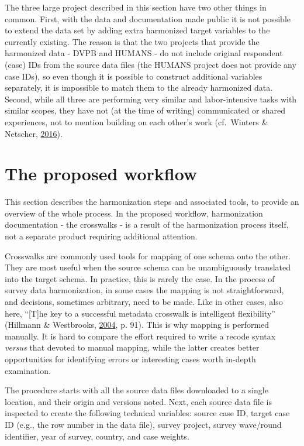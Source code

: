 \documentclass[12pt,]{article}
\begin{document}
The three large project described in this section have two other things in common. First, with the data and documentation made public it is not possible to extend the data set by adding extra harmonized target variables to the currently existing. The reason is that the two projects that provide the harmonized data - DVPB and HUMANS - do not include original respondent (case) IDs from the source data files (the HUMANS project does not provide any case IDs), so even though it is possible to construct additional variables separately, it is impossible to match them to the already harmonized data. Second, while all three are performing very similar and labor-intensive tasks with similar scopes, they have not (at the time of writing) communicated or shared experiences, not to mention building on each other's work (cf.~Winters \& Netscher, \protect\hyperlink{ref-Winters2016}{2016}).

\hypertarget{the-proposed-workflow}{%
\section{The proposed workflow}\label{the-proposed-workflow}}

This section describes the harmonization steps and associated tools, to provide an overview of the whole process. In the proposed workflow, harmonization documentation - the crosswalks - is a result of the harmonization process itself, not a separate product requiring additional attention.

Crosswalks are commonly used tools for mapping of one schema onto the other. They are most useful when the source schema can be unambiguously translated into the target schema. In practice, this is rarely the case. In the process of survey data harmonization, in some cases the mapping is not straightforward, and decisions, sometimes arbitrary, need to be made. Like in other cases, also here, ``{[}T{]}he key to a successful metadata crosswalk is intelligent flexibility'' (Hillmann \& Westbrooks, \protect\hyperlink{ref-Hillmann2004}{2004}, p. 91). This is why mapping is performed manually. It is hard to compare the effort required to write a recode syntax \emph{versus} that devoted to manual mapping, while the latter creates better opportunities for identifying errors or interesting cases worth in-depth examination.

The procedure starts with all the source data files downloaded to a single location, and their origin and versions noted. Next, each source data file is inspected to create the following technical variables: source case ID, target case ID (e.g., the row number in the data file), survey project, survey wave/round identifier, year of survey, country, and case weights.
\end{document}
